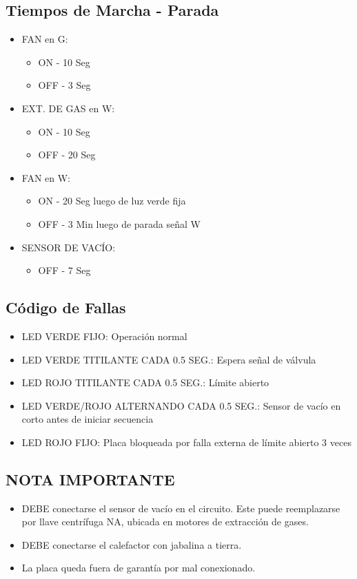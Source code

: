 \documentclass{article}
\begin{document}
\newpage

\subsection*{Tiempos de Marcha - Parada}
\begin{itemize}
\item FAN en G:
\begin{itemize}
\item ON - 10 Seg
\item OFF - 3 Seg
\end{itemize}

\item EXT. DE GAS en W:
\begin{itemize}
\item ON - 10 Seg
\item OFF - 20 Seg
\end{itemize}

\item FAN en W:
\begin{itemize}
\item ON - 20 Seg luego de luz verde fija
\item OFF - 3 Min luego de parada señal W
\end{itemize}

\item SENSOR DE VACÍO:
\begin{itemize}
\item OFF - 7 Seg
\end{itemize}
\end{itemize}

\subsection*{Código de Fallas}
\begin{itemize}
\item LED VERDE FIJO: Operación normal
\item LED VERDE TITILANTE CADA 0.5 SEG.: Espera señal de válvula
\item LED ROJO TITILANTE CADA 0.5 SEG.: Límite abierto
\item LED VERDE/ROJO ALTERNANDO CADA 0.5 SEG.: Sensor de vacío en corto antes de iniciar secuencia
\item LED ROJO FIJO: Placa bloqueada por falla externa de límite abierto 3 veces
\end{itemize}

\subsection*{NOTA IMPORTANTE}
\begin{itemize}
\item DEBE conectarse el sensor de vacío en el circuito. Este puede reemplazarse por llave centrífuga NA, ubicada en motores de extracción de gases.
\item DEBE conectarse el calefactor con jabalina a tierra.
\item La placa queda fuera de garantía por mal conexionado.
\end{itemize}
\end{document}
